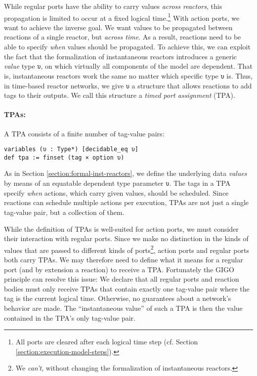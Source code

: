While regular ports have the ability to carry values \emph{across reactors}, this propagation is limited to occur at a fixed logical time.\footnote{
    All ports are cleared after each logical time step (cf. Section \ref{section:execution-model-steps}).
}
With action ports, we want to achieve the inverse goal.
We want values to be propagated between reactions of a single reactor, but \emph{across time}.
As a result, reactions need to be able to specify \emph{when} values should be propagated.
To achieve this, we can exploit the fact that the formalization of instantaneous reactors introduces a generic \emph{value} type \lstinline{υ}, on which virtually all components of the model are dependent.
That is, instantaneous reactors work the same no matter which specific type \lstinline{υ} is.
Thus, in time-based reactor networks, we give \lstinline{υ} a structure that allows reactions to add tags to their outputs.
We call this structure a \emph{timed port assignment} (TPA).

\paragraph{TPAs:}

A TPA consists of a finite number of tag-value pairs:

\begin{lstlisting}
variables (υ : Type*) [decidable_eq υ] 
def tpa := finset (tag × option υ)
\end{lstlisting}

\noindent As in Section \ref{section:formal-inst-reactors}, we define the underlying data \emph{values} by means of an equatable dependent type parameter \lstinline{υ}. 
The tags in a TPA specify \emph{when} actions, which carry given values, should be scheduled.
Since reactions can schedule multiple actions per execution, TPAs are not just a single tag-value pair, but a collection of them.

While the definition of TPAs is well-suited for action ports, we must consider their interaction with regular ports.
Since we make no distinction in the kinds of values that are passed to different kinds of ports\footnote{We \emph{can't}, without changing the formalization of instantaneous reactors.}, action ports and regular ports both carry TPAs.
We may therefore need to define what it means for a regular port (and by extension a reaction) to receive a TPA.
Fortunately the GIGO principle can resolve this issue:
We declare that all regular ports and reaction bodies must only receive TPAs that contain exactly one tag-value pair where the tag is the current logical time.
Otherwise, no guarantees about a network's behavior are made.
The ``instantaneous value'' of such a TPA is then the value contained in the TPA's only tag-value pair.

